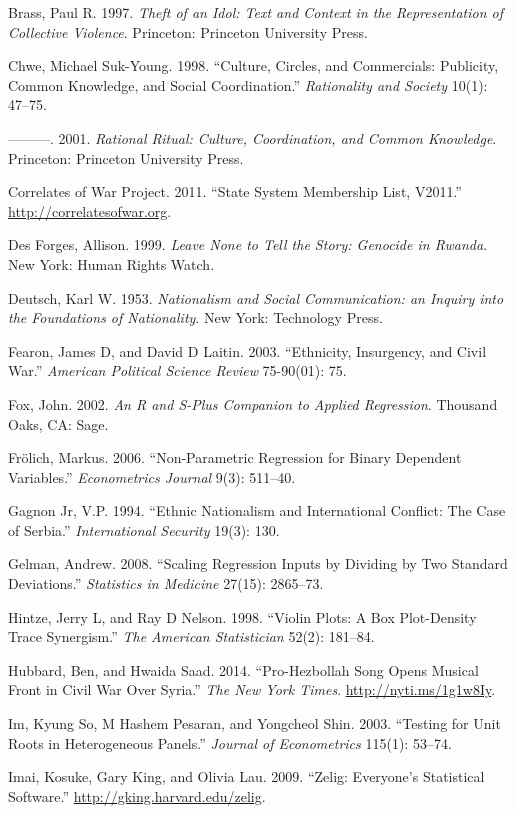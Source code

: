 \documentclass[12pt,article,oneside]{memoir}
\begin{document}
Brass, Paul R. 1997. \emph{Theft of an Idol: Text and Context in the
Representation of Collective Violence}. Princeton: Princeton University
Press.

Chwe, Michael Suk-Young. 1998. ``Culture, Circles, and Commercials:
Publicity, Common Knowledge, and Social Coordination.''
\emph{Rationality and Society} 10(1): 47--75.

---------. 2001. \emph{Rational Ritual: Culture, Coordination, and
Common Knowledge}. Princeton: Princeton University Press.

Correlates of War Project. 2011. ``State System Membership List,
V2011.'' \url{http://correlatesofwar.org}.

Des Forges, Allison. 1999. \emph{Leave None to Tell the Story: Genocide
in Rwanda}. New York: Human Rights Watch.

Deutsch, Karl W. 1953. \emph{Nationalism and Social Communication: an
Inquiry into the Foundations of Nationality}. New York: Technology
Press.

Fearon, James D, and David D Laitin. 2003. ``Ethnicity, Insurgency, and
Civil War.'' \emph{American Political Science Review} 75-90(01): 75.

Fox, John. 2002. \emph{An R and S-Plus Companion to Applied Regression}.
Thousand Oaks, CA: Sage.

Fr{ö}lich, Markus. 2006. ``Non-Parametric Regression for Binary
Dependent Variables.'' \emph{Econometrics Journal} 9(3): 511--40.

Gagnon Jr, V.P. 1994. ``Ethnic Nationalism and International Conflict:
The Case of Serbia.'' \emph{International Security} 19(3): 130.

Gelman, Andrew. 2008. ``Scaling Regression Inputs by Dividing by Two
Standard Deviations.'' \emph{Statistics in Medicine} 27(15): 2865--73.

Hintze, Jerry L, and Ray D Nelson. 1998. ``Violin Plots: A Box
Plot-Density Trace Synergism.'' \emph{The American Statistician} 52(2):
181--84.

Hubbard, Ben, and Hwaida Saad. 2014. ``Pro-Hezbollah Song Opens Musical
Front in Civil War Over Syria.'' \emph{The New York Times}.
\url{http://nyti.ms/1g1w8Iy}.

Im, Kyung So, M Hashem Pesaran, and Yongcheol Shin. 2003. ``Testing for
Unit Roots in Heterogeneous Panels.'' \emph{Journal of Econometrics}
115(1): 53--74.

Imai, Kosuke, Gary King, and Olivia Lau. 2009. ``Zelig: Everyone's
Statistical Software.'' \url{http://gking.harvard.edu/zelig}.
\end{document}
